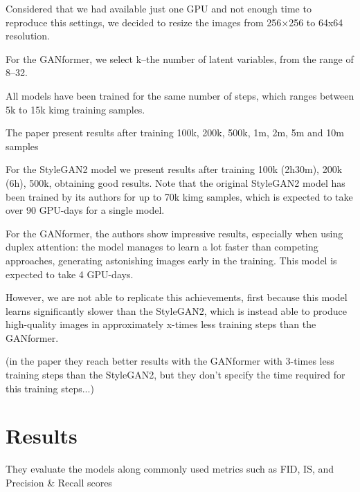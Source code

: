 \documentclass{article}
\begin{document}
	Considered that we had available just one GPU and not enough time to reproduce this settings, we 
	decided to resize the images from 256×256 to 64x64 resolution.
	
	
	For the GANformer, we select k–the number of latent variables, from the range of 8–32. 
	
	All models have been trained for the same number of steps, which ranges between 5k to 15k kimg 
	training samples. 
	
	The paper present results after training 100k, 200k, 500k, 1m, 2m, 5m and 10m samples
	
	For the StyleGAN2 model we present results after training 100k (2h30m), 200k (6h), 500k, obtaining 
	good results.
	Note that the original StyleGAN2 model has been trained by its authors \cite{karras2020analyzing} 
	for up to 70k kimg samples, which is expected to take over 90 GPU-days for a single model. 
	

	For the GANformer, the authors \cite{karras2020analyzing} show impressive results, especially when 
	using duplex attention: the model manages to learn a lot faster than competing approaches, 
	generating astonishing images early in the training. This model is expected to take 4 GPU-days.
	
	However, we are not able to replicate this achievements, first because this model learns significantly 
	slower than the StyleGAN2, which is instead able to produce high-quality images in approximately 
	x-times less training steps than the GANformer.
	
	
	(in the paper they reach better results with the GANformer with 3-times less training steps than the 
	StyleGAN2, but they don't specify the time required for this training steps...)

	\section{Results}%
	
	They evaluate the models along commonly used metrics such as FID, IS, and Precision \& Recall 
	scores
	
\end{document}
